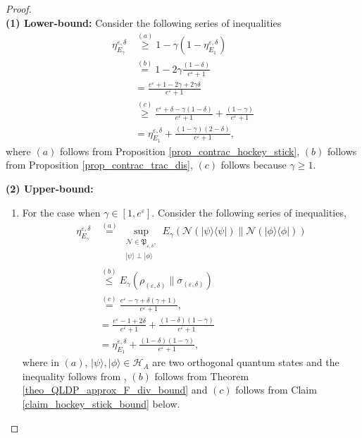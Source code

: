 \documentclass[onecolumn,ldraftcls, 11pt]{IEEEtran}
\newcommand{\RNum}[1]{\uppercase\expandafter{\romannumeral #1\relax}}
\newcommand{\nn}{\nonumber}
\newcommand{\ketbra}[1]{|#1\rangle\langle#1|}
\newcommand{\eps}{\varepsilon}
\newcommand*{\cH}{\mathcal{H}}
\newcommand*{\cN}{\mathcal{N}}
\newcommand{\ket}[1]{|#1 \rangle}
\begin{document}
\begin{proof}
\hfill\\
\quad\textbf{(1) Lower-bound:} Consider the following series of inequalities 
\begin{align*}
    \eta_{E_{\gamma}}^{\eps,\delta} &\overset{(a)}\geq 1-\gamma(1-\eta^{\eps,\delta}_{E_1})\\
    &\overset{(b)}=1 -2\gamma\frac{(1-\delta)}{e^\eps+1}\\
    & = \frac{e^\eps+1-2\gamma + 2\gamma\delta}{e^\eps+1}\\
    &\overset{(c)}\geq \frac{e^\eps+\delta -\gamma(1-\delta)}{e^\eps+1}+\frac{(1-\gamma)}{e^\eps+1}\\
    & = \eta^{\eps,\delta}_{E_1}+\frac{(1-\gamma)(2-\delta)}{e^\eps+1},
\end{align*}
where $(a)$ follows from Proposition \ref{prop_contrac_hockey_stick}, $(b)$ follows from Proposition \ref{prop_contrac_trac_dis}, $(c)$ follows because $\gamma \geq 1.$


\textbf{(2) Upper-bound:}
\begin{enumerate}[label=(\roman*)]

\item For the case when  $\gamma \in [1,e^\eps]$. Consider the following series of inequalities,
    {\allowdisplaybreaks\begin{align}
        \eta_{E_{\gamma}}^{\eps,\delta} 
        &\overset{(a)}{=} \sup_{\substack{\cN \in \mathfrak{P}_{\eps,\delta},\\ \ket{\psi}\perp\ket{\phi}}} E_{\gamma}(\cN(\ketbra{\psi})\|\cN(\ketbra{\phi}))\nn\\
        &\overset{(b)}{\leq}  E_{\gamma}(\rho_{(\eps,\delta)}\|\sigma_{(\eps,\delta)})\nn\\
    &\overset{(c)}=\frac{e^\eps -\gamma + \delta(\gamma+1)}{e^\eps+1},\label{proof_lemma_contrac_hockey_stick_eq1}\\
   &= \frac{e^\eps - 1 + 2\delta}{e^\eps + 1} + \frac{(1-\delta)(1-\gamma)}{e^\eps + 1}\nn\\
   &= \eta^{\eps,\delta}_{E_1} + \frac{(1-\delta)(1-\gamma)}{e^\eps+ 1},\label{lemma_contrac_hockey_stick_eq1}
        \end{align}}
where in $(a)$, $\ket{\psi},\ket{\phi} \in \cH_A$ are two orthogonal quantum states and the inequality follows from \cite[Theorem \RNum{2}.2]{HRF23}, 
$(b)$ follows from Theorem \ref{theo_QLDP_approx_F_div_bound} and $(c)$ follows from Claim \ref{claim_hockey_stick_bound} below.


\end{enumerate}
\end{proof}
\end{document}
